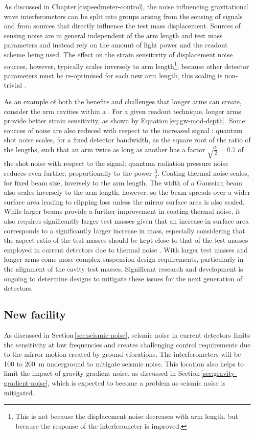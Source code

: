 As discussed in Chapter\,\ref{c:speedmeter-control}, the noise influencing gravitational wave interferometers can be split into groups arising from the sensing of signals and from sources that directly influence the test mass displacement. Sources of sensing noise are in general independent of the arm length and test mass parameters and instead rely on the amount of light power and the readout scheme being used. The effect on the strain sensitivity of displacement noise sources, however, typically scales inversely to arm length\footnote{This is not because the displacement noise decreases with arm length, but because the response of the interferometer is improved.}; because other detector parameters must be re-optimised for each new arm length, this scaling is non-trivial \cite{Dwyer2015}.

As an example of both the benefits and challenges that longer arms can create, consider the arm cavities within a \FPMI{}. For a given readout technique, longer arms provide better strain sensitivity, as shown by Equation\,\ref{eq:gw-mod-depth}. Some sources of noise are also reduced with respect to the increased signal \cite{aligocosmic2016}: quantum shot noise scales, for a fixed detector bandwidth, as the square root of the ratio of the lengths, such that an arm twice as long as another has a factor $\sqrt{\frac{1}{2}} = 0.7$ of the shot noise with respect to the signal; quantum radiation pressure noise reduces even further, proportionally to the power $\frac{3}{2}$. Coating thermal noise scales, for fixed beam size, inversely to the arm length. The width of a Gaussian beam also scales inversely to the arm length, however, so the beam spreads over a wider surface area leading to clipping loss unless the mirror surface area is also scaled. While larger beams provide a further improvement in coating thermal noise, it also requires significantly larger test masses given that an increase in surface area corresponds to a significantly larger increase in mass, especially considering that the aspect ratio of the test masses should be kept close to that of the test masses employed in current detectors due to thermal noise \cite{Somiya2009a}. With larger test masses and longer arms come more complex suspension design requirements, particularly in the alignment of the cavity test masses. Significant research and development is ongoing to determine designs to mitigate these issues for the next generation of detectors.

\subsection{New facility}
As discussed in Section\,\ref{sec:seismic-noise}, seismic noise in current detectors limits the sensitivity at low frequencies and creates challenging control requirements due to the mirror motion created by ground vibrations. The \ET{} interferometers will be \num{100} to \SI{200}{\meter} underground to mitigate seismic noise. This location also helps to limit the impact of gravity gradient noise, as discussed in Section\,\ref{sec:gravity-gradient-noise}, which is expected to become a problem as seismic noise is mitigated.

